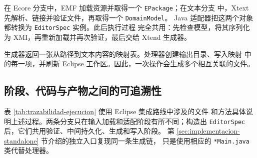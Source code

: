 在 Ecore 分支中，EMF 加载资源并取得一个 \texttt{EPackage}；在文本分支
中，Xtext 先解析、链接并验证文件，再取得一个 \texttt{DomainModel}。
Java 适配器把这两个对象都转换为 \texttt{EditorSpec} 实例。此后执行过程
完全共用：先检查模型，将其序列化为 XMI，再重新加载并再次验证，最后交给
Xtend 生成器。

生成器返回一张从路径到文本内容的映射表。处理器创建输出目录、写入映射
中的每一项，并刷新 Eclipse 工作区。因此，一次操作会生成多个相互关联的文件。

\subsection{阶段、代码与产物之间的可追溯性}

表 \ref{tab:trazabilidad-ejecucion} 使用 Eclipse 集成路线中涉及的文件
和方法具体说明上述过程。两条分支只在输入加载和适配阶段有所不同；构造出
\texttt{EditorSpec} 后，它们共用验证、中间持久化、生成和写入阶段。
第 \ref{sec:implementacion-standalone} 节介绍的独立入口复现同一条生成链，
只是使用相应的 \texttt{*Main.java} 类代替处理器。

